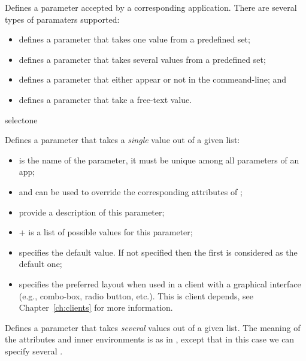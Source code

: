 \bigskip
{}
{
%
  Defines a parameter accepted by a corresponding application. There
  are several types of paramaters supported:
\begin{itemize}
\item {} defines a parameter that takes one
  value from a predefined set;
\item {} defines a parameter that takes several
  values from a predefined set;
\item {} defines a parameter that either appear or
  not in the commeand-line; and
\item {} defines a parameter that take a
  free-text value.
\end{itemize}
%
}
{}%

\bigskip
\xmlstruct
{selectone}
{%
%
  Defines a parameter that takes a \emph{single} value out of a given
  list:

  \begin{itemize}
  \item {} is the name of the parameter, it must be
    unique among all parameters of an app;

  \item {} and  can be used
    to override the corresponding attributes of
    ;

  \item {} provide a description of this parameter;

  \item {}+ is a list of possible values for
    this parameter;

  \item {} specifies the default value. If
    not specified then the first  is considered
    as the default one;

  \item {} specifies the preferred layout when
    used in a client with a graphical interface (e.g., combo-box,
    radio button, etc.). This is client depends, see
    Chapter~\ref{ch:clients} for more information.

  \end{itemize}
%
}
{}%

\bigskip
{}
{%
%
  Defines a parameter that takes \emph{several} values out of a given
  list. The meaning of the attributes and inner environments is as in
  , except that in this case we can specify
  several  .
%
}
{}%

